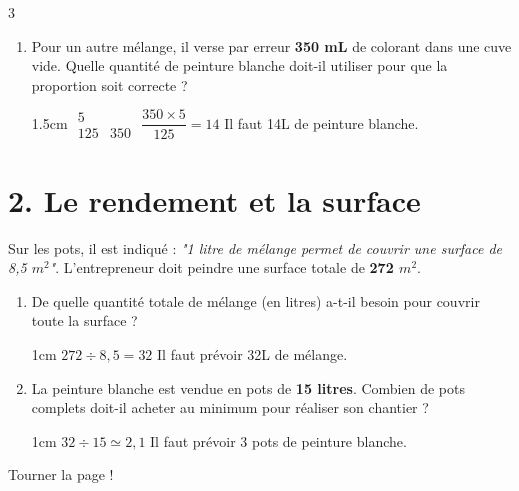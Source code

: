 \documentclass[a4paper]{book}
\begin{document}
{\begin{exerciceNote}{3}
\begin{enumerate}[leftmargin=*]
            \item Pour un autre mélange, il verse par erreur \textbf{350 mL} de colorant dans une cuve vide. Quelle quantité de peinture blanche doit-il utiliser pour que la proportion soit correcte ?

                        
            \begin{ZoneReponse}{1.5cm}
                $\begin{array}{c|c}
                     5 &  \\ \hline
                     125 & 350
                \end{array}$ 
                \quad $\dfrac{350\times5}{125}=14$
                \quad Il faut 14L de peinture blanche.
            \end{ZoneReponse}
        \end{enumerate}
        
        \section*{2. Le rendement et la surface}
        Sur les pots, il est indiqué : \textit{"1 litre de mélange permet de couvrir une surface de 8,5 $m^2$"}. L'entrepreneur doit peindre une surface totale de \textbf{272 $m^2$}.
        
        \begin{enumerate}[resume, leftmargin=*]
            \item De quelle quantité totale de mélange (en litres) a-t-il besoin pour couvrir toute la surface ?
            
            \begin{ZoneReponse}{1cm}   
                $272\div8,5=32$ \quad Il faut prévoir 32L de mélange.
            \end{ZoneReponse}
            
            \item La peinture blanche est vendue en pots de \textbf{15 litres}. Combien de pots complets doit-il acheter au minimum pour réaliser son chantier ?

            \begin{ZoneReponse}{1cm}  
                $32\div15\simeq2,1$ \quad Il faut prévoir 3 pots de peinture blanche.
            \end{ZoneReponse}
        \end{enumerate}
        

\vfill
\hfill Tourner la page !


\end{exerciceNote}}
\end{document}
